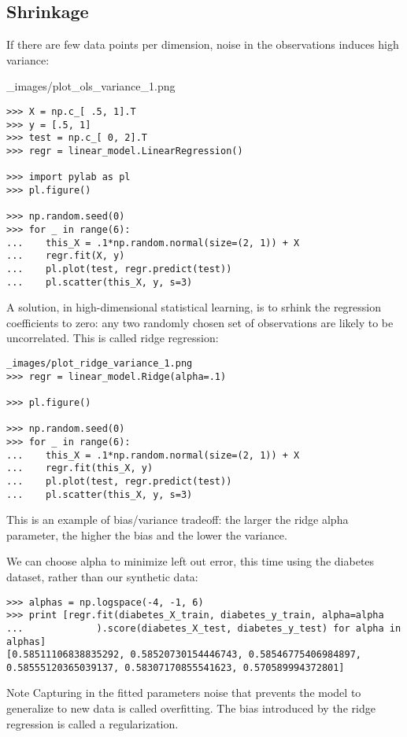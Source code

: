 
\subsection{Shrinkage}

If there are few data points per dimension, noise in the observations induces high variance:

_images/plot_ols_variance_1.png
\begin{framed}
\begin{verbatim}
>>> X = np.c_[ .5, 1].T
>>> y = [.5, 1]
>>> test = np.c_[ 0, 2].T
>>> regr = linear_model.LinearRegression()

>>> import pylab as pl
>>> pl.figure() 

>>> np.random.seed(0)
>>> for _ in range(6): 
...    this_X = .1*np.random.normal(size=(2, 1)) + X
...    regr.fit(X, y)
...    pl.plot(test, regr.predict(test))
...    pl.scatter(this_X, y, s=3)
\end{verbatim}
\end{framed}
A solution, in high-dimensional statistical learning, is to srhink the regression coefficients to zero: any two randomly chosen set of observations are likely to be uncorrelated. This is called ridge regression:
\begin{framed}
\begin{verbatim}
_images/plot_ridge_variance_1.png
>>> regr = linear_model.Ridge(alpha=.1)

>>> pl.figure() 

>>> np.random.seed(0)
>>> for _ in range(6): 
...    this_X = .1*np.random.normal(size=(2, 1)) + X
...    regr.fit(this_X, y)
...    pl.plot(test, regr.predict(test))
...    pl.scatter(this_X, y, s=3)
\end{verbatim}
\end{framed}
This is an example of bias/variance tradeoff: the larger the ridge alpha parameter, the higher the bias and the lower the variance.

We can choose alpha to minimize left out error, this time using the diabetes dataset, rather than our synthetic data:
\begin{framed}
\begin{verbatim}
>>> alphas = np.logspace(-4, -1, 6)
>>> print [regr.fit(diabetes_X_train, diabetes_y_train, alpha=alpha
...             ).score(diabetes_X_test, diabetes_y_test) for alpha in alphas]
[0.58511106838835292, 0.58520730154446743, 0.58546775406984897, 0.58555120365039137, 0.58307170855541623, 0.570589994372801]

\end{verbatim}
\end{framed}
Note Capturing in the fitted parameters noise that prevents the model to generalize to new data is called overfitting. The bias introduced by the ridge regression is called a regularization.

